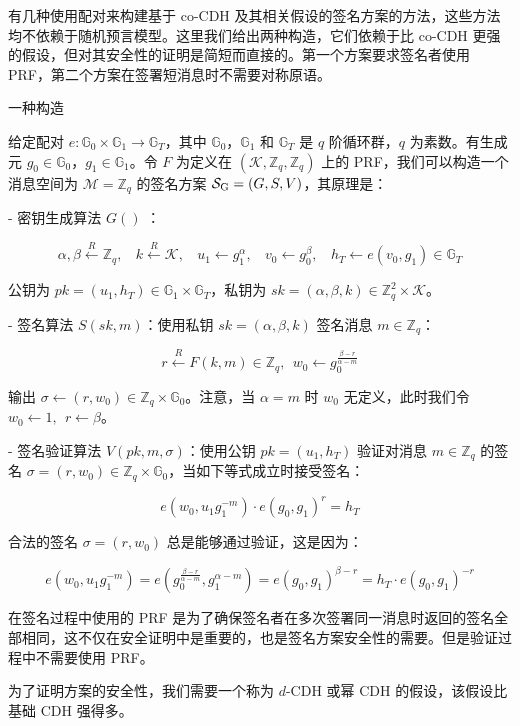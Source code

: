 有几种使用配对来构建基于 co-CDH 及其相关假设的签名方案的方法，这些方法均不依赖于随机预言模型。这里我们给出两种构造，它们依赖于比 co-CDH 更强的假设，但对其安全性的证明是简短而直接的。第一个方案要求签名者使用 PRF，第二个方案在签署短消息时不需要对称原语。

一种构造

给定配对 $e: \mathbb{G}_0 \times\mathbb{G}_1\to\mathbb{G}_T$，其中 $\mathbb{G}_0$，$\mathbb{G}_1$ 和 $\mathbb{G}_T$ 是 $q$ 阶循环群，$q$ 为素数。有生成元 $g_0\in\mathbb{G}_0$，$g_1\in\mathbb{G}_1$。令 $F$ 为定义在 $(\mathcal{K},\mathbb{Z}_q,\mathbb{Z}_q)$ 上的 PRF，我们可以构造一个消息空间为 $\mathcal{M}=\mathbb{Z}_q$ 的签名方案 $\mathcal{S}_{\rm G}=(G,S,V)$，其原理是：

- 密钥生成算法 $G()$ ：
    
    $$
    \alpha,\beta\overset{R}\leftarrow\mathbb{Z}_q,~~~~
    k\overset{R}\leftarrow\mathcal{K},~~~~
    u_1\leftarrow g_1^\alpha,~~~~
    v_0\leftarrow g_0^\beta,~~~~
    h_T\leftarrow e(v_0,g_1)\in\mathbb{G}_T
    $$
    
    公钥为 $pk=(u_1,h_T)\in\mathbb{G}_1\times\mathbb{G}_T$，私钥为 $sk=(\alpha,\beta,k)\in\mathbb{Z}_q^2\times\mathcal{K}$。
    
- 签名算法 $S(sk,m)$：使用私钥 $sk=(\alpha,\beta,k)$ 签名消息 $m\in\mathbb{Z}_q$：
    
    $$
    r\overset{R}\leftarrow F(k,m)\in\mathbb{Z}_q,~~
    w_0\leftarrow g_0^{\frac{\beta-r}{\alpha-m}}
    $$
    
    输出 $\sigma \leftarrow (r,w_0)\in\mathbb{Z}_q\times\mathbb{G}_0$。注意，当 $\alpha=m$ 时 $w_0$ 无定义，此时我们令 $w_0\leftarrow 1,~~r\leftarrow \beta$。
    
- 签名验证算法 $V(pk,m,\sigma)$：使用公钥 $pk=(u_1,h_T)$ 验证对消息 $m\in\mathbb{Z}_q$ 的签名 $\sigma=(r,w_0)\in\mathbb{Z}_q\times\mathbb{G}_0$，当如下等式成立时接受签名：

$$
e(w_0,u_1g_1^{-m})\cdot e(g_0,g_1)^r=h_T
$$

合法的签名 $\sigma=(r,w_0)$ 总是能够通过验证，这是因为：

$$
e(w_0,u_1g_1^{-m})=e(g_0^{\frac{\beta-r}{\alpha-m}},g_1^{\alpha-m})=e(g_0,g_1)^{\beta-r}=h_T\cdot e(g_0,g_1)^{-r}
$$

在签名过程中使用的 PRF 是为了确保签名者在多次签署同一消息时返回的签名全部相同，这不仅在安全证明中是重要的，也是签名方案安全性的需要。但是验证过程中不需要使用 PRF。

为了证明方案的安全性，我们需要一个称为 $d$-CDH 或幂 CDH 的假设，该假设比基础 CDH 强得多。

